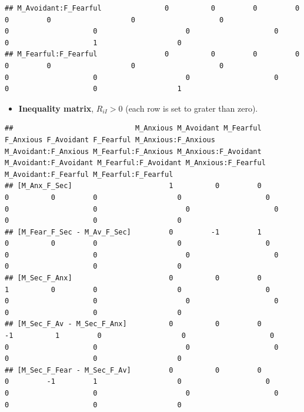\documentclass[
]{book}
\providecommand{\tightlist}{%
  \setlength{\itemsep}{0pt}\setlength{\parskip}{0pt}}
\begin{document}
\begin{verbatim}
## M_Avoidant:F_Fearful               0          0         0         0          0         0                   0                    0                   0                    0                     0                    0                   0                    1                   0
## M_Fearful:F_Fearful                0          0         0         0          0         0                   0                    0                   0                    0                     0                    0                   0                    0                   1
\end{verbatim}

\begin{itemize}
\tightlist
\item
  \textbf{Inequality matrix}, \(R_{iI} > 0\) (each row is set to grater than zero).
\end{itemize}

\begin{verbatim}
##                             M_Anxious M_Avoidant M_Fearful F_Anxious F_Avoidant F_Fearful M_Anxious:F_Anxious M_Avoidant:F_Anxious M_Fearful:F_Anxious M_Anxious:F_Avoidant M_Avoidant:F_Avoidant M_Fearful:F_Avoidant M_Anxious:F_Fearful M_Avoidant:F_Fearful M_Fearful:F_Fearful
## [M_Anx_F_Sec]                       1          0         0         0          0         0                   0                    0                   0                    0                     0                    0                   0                    0                   0
## [M_Fear_F_Sec - M_Av_F_Sec]         0         -1         1         0          0         0                   0                    0                   0                    0                     0                    0                   0                    0                   0
## [M_Sec_F_Anx]                       0          0         0         1          0         0                   0                    0                   0                    0                     0                    0                   0                    0                   0
## [M_Sec_F_Av - M_Sec_F_Anx]          0          0         0        -1          1         0                   0                    0                   0                    0                     0                    0                   0                    0                   0
## [M_Sec_F_Fear - M_Sec_F_Av]         0          0         0         0         -1         1                   0                    0                   0                    0                     0                    0                   0                    0                   0
\end{verbatim}
\end{document}
